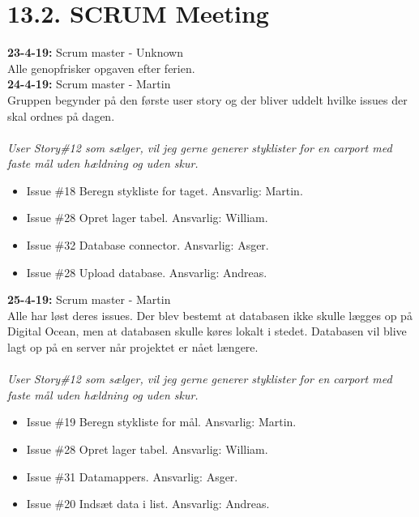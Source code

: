 \documentclass[11pt]{report}
\begin{document}
\section*{13.2. SCRUM Meeting}

\textbf{23-4-19:} Scrum master - Unknown\\
Alle genopfrisker opgaven efter ferien. \\

\noindent\textbf{24-4-19:} Scrum master - Martin\\
Gruppen begynder på den første user story og der bliver uddelt hvilke
issues der skal ordnes på dagen.\\\\
\textit{User Story\#12 som sælger, vil jeg gerne generer styklister
  for en carport med faste mål uden hældning og uden skur.}
\begin{itemize}
\renewcommand\labelitemi{--}
\item Issue \#18 Beregn stykliste for taget. Ansvarlig: Martin.
\item Issue \#28 Opret lager tabel. Ansvarlig: William.
\item Issue \#32 Database connector. Ansvarlig: Asger.
\item Issue \#28 Upload database. Ansvarlig: Andreas.
\end{itemize}

\noindent\textbf{25-4-19:} Scrum master - Martin\\
Alle har løst deres issues. Der blev bestemt at databasen ikke skulle lægges op på Digital Ocean, men at databasen skulle køres lokalt i stedet. Databasen vil blive lagt op på en server når projektet er nået længere.\\\\
\textit{User Story\#12 som sælger, vil jeg gerne generer styklister for en carport med faste mål uden hældning og uden skur.}
\begin{itemize}
\renewcommand\labelitemi{--}
\item Issue \#19 Beregn stykliste for mål. Ansvarlig: Martin.
\item Issue \#28 Opret lager tabel. Ansvarlig: William.
\item Issue \#31 Datamappers. Ansvarlig: Asger.
\item Issue \#20 Indsæt data i list. Ansvarlig: Andreas.
\end{itemize}
\end{document}
